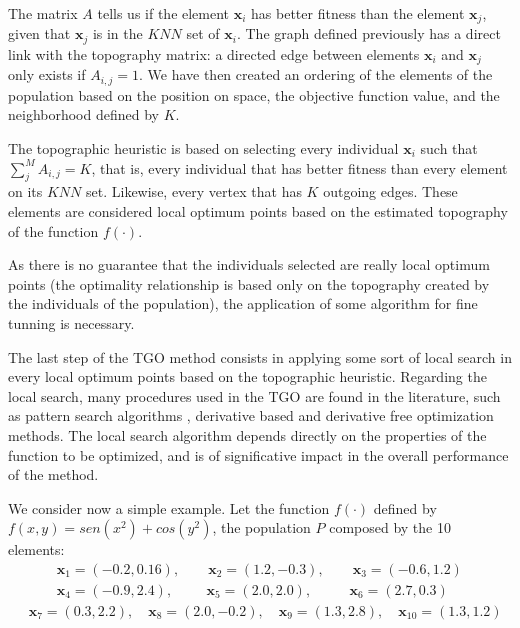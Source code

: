 The matrix $A$ tells us if the element $\bm{x}_i$ has better fitness than the element $\bm{x}_j$, given that $\bm{x}_j$ is in the $KNN$ set of $\bm{x}_i$. The graph defined previously has a direct link with the topography matrix: a directed edge between elements $\bm{x}_i$ and $\bm{x}_j$ only exists if $A_{i, j} = 1$. We have then created an ordering of the elements of the population based on the position on space, the objective function value, and the neighborhood defined by $K$.

The topographic heuristic is based on selecting every individual $\bm{x}_i$ such that $\sum_j^M A_{i, j} = K$, that is, every individual that has better fitness than every element on its $KNN$ set. Likewise, every vertex that has $K$ outgoing edges. These elements are considered local optimum points based on the estimated topography of the function $f(\cdot)$.

As there is no guarantee that the individuals selected are really local optimum points (the optimality relationship is based only on the topography created by the individuals of the population), the application of 
some algorithm for fine tunning is necessary.

The last step of the TGO method consists in applying some sort of local search in every local optimum points based on the topographic heuristic. Regarding the local search, many procedures used in the TGO are found in the literature, such as pattern search algorithms \citep{ITGO2}, derivative based \citep{ITGO3} and derivative free \citep{ITGO4} optimization methods. The local search algorithm depends directly on the properties of the function to be optimized, and is of significative impact in the overall performance of the method.

We consider now a simple example. Let the function $f(\cdot)$ defined by $f(x, y) = sen(x^2) + cos(y^2)$, the population $P$ composed by the 10 elements: \\[-4em]

\begin{equation*}
  \begin{aligned}
& \qquad \bm{x}_1 = (-0.2, 0.16), \qquad \bm{x}_2 = (1.2, -0.3), \qquad \bm{x}_3 = (-0.6, 1.2) \\
& \qquad \bm{x}_4 = (-0.9, 2.4), \qquad \ \, \bm{x}_5 = (2.0, 2.0), \qquad \ \ \ \bm{x}_6 = (2.7, 0.3) \\
& \bm{x}_7 = (0.3, 2.2), \quad \bm{x}_8 = (2.0, -0.2), \quad \bm{x}_9 = (1.3, 2.8), \quad \bm{x}_{10} = (1.3, 1.2) \\
  \end{aligned}
\end{equation*}

